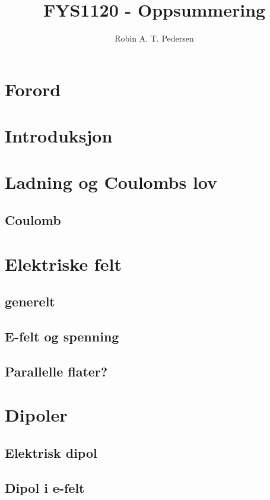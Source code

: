 \documentclass{article}
\begin{document}
  \title{FYS1120 - Oppsummering}
  \author{Robin A. T. Pedersen}
  \maketitle
  \tableofcontents

  \section{Forord}
    
  \section{Introduksjon}
    
  \section{Ladning og Coulombs lov}
    \subsection{Coulomb}
      
  \section{Elektriske felt}
    \subsection{generelt}
      
    \subsection{E-felt og spenning}
      
    \subsection{Parallelle flater?}
      
  \section{Dipoler}
    \subsection{Elektrisk dipol}
      
    \subsection{Dipol i e-felt}
      
\end{document}
